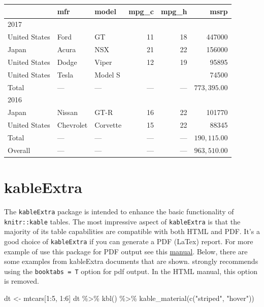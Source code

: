\documentclass[
]{book}
\newenvironment{Shaded}{\begin{snugshade}}{\end{snugshade}}
\newcommand{\DecValTok}[1]{\textcolor[rgb]{0.00,0.00,0.81}{#1}}
\newcommand{\FunctionTok}[1]{\textcolor[rgb]{0.00,0.00,0.00}{#1}}
\newcommand{\NormalTok}[1]{#1}
\newcommand{\OtherTok}[1]{\textcolor[rgb]{0.56,0.35,0.01}{#1}}
\newcommand{\SpecialCharTok}[1]{\textcolor[rgb]{0.00,0.00,0.00}{#1}}
\newcommand{\StringTok}[1]{\textcolor[rgb]{0.31,0.60,0.02}{#1}}
\begin{document}
\captionsetup[table]{labelformat=empty,skip=1pt}
\begin{longtable}{lllrrr}
\toprule
 & mfr & model & mpg\_c & mpg\_h & msrp \\ 
\midrule
\multicolumn{1}{l}{2017} \\ 
\midrule
United States & Ford & GT & 11 & 18 & 447000 \\ 
Japan & Acura & NSX & 21 & 22 & 156000 \\ 
United States & Dodge & Viper & 12 & 19 & 95895 \\ 
United States & Tesla & Model S &  &  & 74500 \\ 
\midrule 
Total & — & — & — & — & $773,395.00$ \\ 
\midrule
\multicolumn{1}{l}{2016} \\ 
\midrule
Japan & Nissan & GT-R & 16 & 22 & 101770 \\ 
United States & Chevrolet & Corvette & 15 & 22 & 88345 \\ 
\midrule 
Total & — & — & — & — & $190,115.00$ \\ 
 \midrule 
\midrule 
Overall & — & — & — & — & $963,510.00$ \\ 
\bottomrule
\end{longtable}

\hypertarget{kableextra}{%
\section{kableExtra}\label{kableextra}}

The \texttt{kableExtra} package is intended to enhance the basic functionality of \texttt{knitr::kable} tables.
The most impressive aspect of \texttt{kableExtra} is that the majority of its table capabilities are compatible with both HTML and PDF. It's a good choice of \texttt{kableExtra} if you can generate a PDF (LaTex) report. For more example of use this package for PDF output see this
\href{http://haozhu233.github.io/kableExtra/awesome_table_in_pdf.pdf}{manual}.
Below, there are some examples from kableExtra documents that are shown.
strongly recommends using the \texttt{booktabs\ =\ T} option for pdf output.
In the HTML manual, this option is removed.

\begin{Shaded}
\begin{Highlighting}[]
\NormalTok{dt }\OtherTok{\textless{}{-}}\NormalTok{ mtcars[}\DecValTok{1}\SpecialCharTok{:}\DecValTok{5}\NormalTok{, }\DecValTok{1}\SpecialCharTok{:}\DecValTok{6}\NormalTok{]}
\NormalTok{dt }\SpecialCharTok{\%\textgreater{}\%} 
\FunctionTok{kbl}\NormalTok{() }\SpecialCharTok{\%\textgreater{}\%}
    \FunctionTok{kable\_material}\NormalTok{(}\FunctionTok{c}\NormalTok{(}\StringTok{"striped"}\NormalTok{, }\StringTok{"hover"}\NormalTok{))}
\end{Highlighting}
\end{Shaded}
\end{document}

